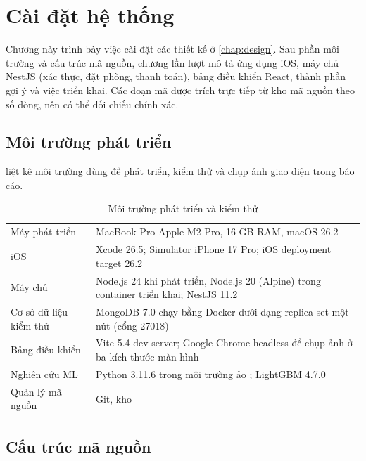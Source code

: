 \chapter{Cài đặt hệ thống}\label{chap:implementation}

Chương này trình bày việc cài đặt các thiết kế ở \cref{chap:design}. Sau phần môi trường và cấu trúc mã nguồn, chương lần lượt mô tả ứng dụng iOS, máy chủ NestJS (xác thực, đặt phòng, thanh toán), bảng điều khiển React, thành phần gợi ý và việc triển khai. Các đoạn mã được trích trực tiếp từ kho mã nguồn theo số dòng, nên có thể đối chiếu chính xác.

\section{Môi trường phát triển}\label{sec:env}

 liệt kê môi trường dùng để phát triển, kiểm thử và chụp ảnh giao diện trong báo cáo.

\begin{table}[H]
\centering
\caption{Môi trường phát triển và kiểm thử}\label{tab:env}
\begin{rtable}
\begin{tabular}{|L{4.2cm}|L{10.5cm}|}
\hline
{} &  \\ \hline
Máy phát triển & MacBook Pro Apple M2 Pro, 16 GB RAM, macOS 26.2 \\ \hline
iOS & Xcode 26.5; Simulator iPhone 17 Pro; iOS deployment target 26.2 \\ \hline
Máy chủ & Node.js 24 khi phát triển, Node.js 20 (Alpine) trong container triển khai; NestJS 11.2 \\ \hline
Cơ sở dữ liệu kiểm thử & MongoDB 7.0 chạy bằng Docker dưới dạng replica set một nút (cổng 27018) \\ \hline
Bảng điều khiển & Vite 5.4 dev server; Google Chrome headless để chụp ảnh ở ba kích thước màn hình \\ \hline
Nghiên cứu ML & Python 3.11.6 trong môi trường ảo ; LightGBM 4.7.0 \\ \hline
Quản lý mã nguồn & Git, kho  \\ \hline
\end{tabular}
\end{rtable}
\end{table}

\section{Cấu trúc mã nguồn}\label{sec:source-tree}

